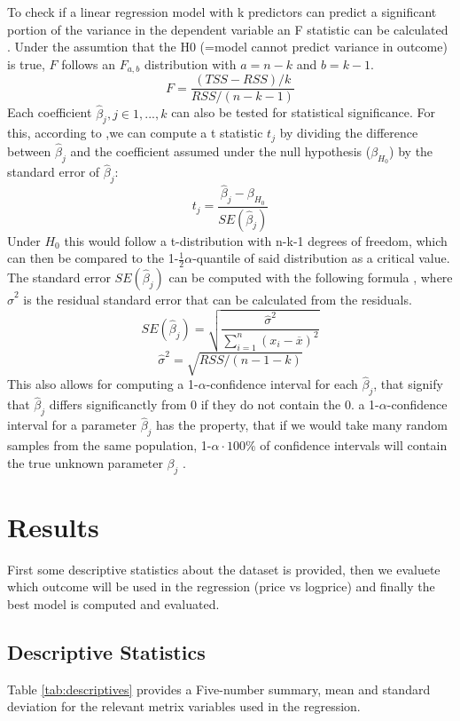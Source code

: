 \documentclass[12 pt]{scrartcl}
\begin{document}
To check if a linear regression model with k predictors can predict a significant portion of the variance in the dependent variable an F statistic can be calculated \citep[p.~76]{james2013introduction}. Under the assumtion that the H0 (=model cannot predict variance in outcome) is true, $F$ follows an $F_{a,b}$ distribution with $a = n-k$ and $b = k-1$.
\[F = \frac{(TSS-RSS)/k}{RSS/(n-k-1)}\]
Each coefficient $\hat{\beta}_j, j \in {1,...,k}$ can also be tested for statistical significance. For this, according to \citet[p.~67]{james2013introduction},we can compute a t statistic $t_j$ by dividing the difference between $\hat{\beta}_j$ and the coefficient assumed under the null hypothesis ($\beta_{H_0}$) by the standard error of $\hat{\beta}_j$:
\[ t_j = \frac{\hat{\beta}_j - \beta_{H_0}}{SE(\hat{\beta}_j)} \]
Under $H_0$ this would follow a t-distribution with n-k-1 degrees of freedom, which can then be compared to the 1-$\frac{1}{2}\alpha$-quantile of said distribution as a critical value.
The standard error $SE(\hat{\beta}_j)$ can be computed with the following formula \citep[p.~66]{james2013introduction}, where $\hat{\sigma}^2$ is the residual standard error that can be calculated from the residuals.
\[SE(\hat{\beta}_j) = \sqrt{\frac{\hat{\sigma}^2}{\sum_{i=1}^n{(x_i-\overline{x})^2}}}\]
\[ \hat{\sigma}^2 = \sqrt{RSS/(n-1-k)}  \]
This also allows for computing a 1-$\alpha$-confidence interval for each $\hat{\beta}_j$, that signify that $\hat{\beta}_j$ differs significanctly from 0 if they do not contain the 0. a 1-$\alpha$-confidence interval for a parameter $\hat{\beta}_j$ has the property, that if we would take many random samples from the same population, 1-$\alpha\cdot100\%$ of confidence intervals will contain the true unknown parameter $\beta_j$ \citep[p.~66]{james2013introduction}.

\section{Results}

First some descriptive statistics about the dataset is provided, then we evaluete which outcome will be used in the regression (price vs logprice) and finally the best model is computed and evaluated.

\subsection{Descriptive Statistics}

Table \ref{tab:descriptives} provides a Five-number summary, mean and standard deviation for the relevant metrix variables used in the regression.
\end{document}
